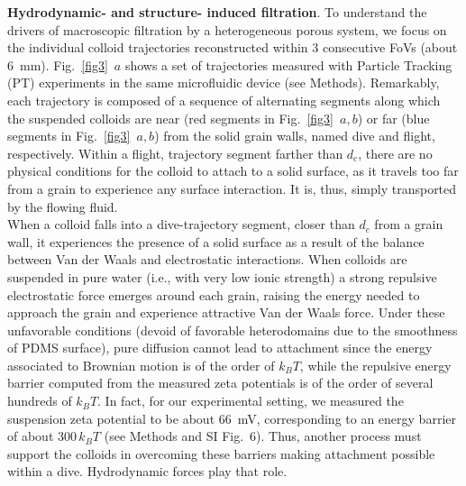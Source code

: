 \documentclass[singlecolumn,pre,notitlepage,preprintnumbers,floatfix,superscriptaddress]{revtex4-1}
\begin{document}
\noindent
\textbf{Hydrodynamic- and structure- induced filtration}.
To understand the drivers of macroscopic filtration by a heterogeneous porous system, we focus on the individual colloid trajectories reconstructed within 3 consecutive FoVs (about $6$~mm). Fig.~\ref{fig3}~$a$ shows a set of trajectories measured with Particle Tracking (PT) experiments in the same microfluidic device (see Methods). Remarkably, each trajectory is composed of a sequence of alternating segments along which the suspended colloids are near (red segments in Fig.~\ref{fig3}~$a,b$) or far (blue segments in Fig.~\ref{fig3}~$a,b$) from the solid grain walls, named dive and flight, respectively. Within a flight, trajectory segment farther than $d_c$, there are no physical conditions for the colloid to attach to a solid surface, as it travels too far from a grain to experience any surface interaction. It is, thus, simply transported by the flowing fluid. \\

\noindent
When a colloid falls into a dive-trajectory segment, closer than $d_c$ from a grain wall, it experiences the presence of a solid surface as a result of the balance between Van der Waals and electrostatic interactions. When colloids are suspended in pure water (i.e., with very low ionic strength) a strong repulsive electrostatic force emerges around each grain, raising the energy needed to approach the grain and experience attractive Van der Waals force. Under these unfavorable conditions (devoid of favorable heterodomains due to the smoothness of PDMS surface), pure diffusion cannot lead to attachment since the energy associated to Brownian motion is of the order of $k_BT$, while the repulsive energy barrier computed from the measured zeta potentials is of the order of several hundreds of $k_BT$. In fact, for our experimental setting, we measured the suspension zeta potential to be about $66$~mV, corresponding to an energy barrier of about $300 \, k_BT$ (see Methods and SI Fig.~6). Thus, another process must support the colloids in overcoming these barriers making attachment possible within a dive. Hydrodynamic forces play that role. \\
\end{document}
